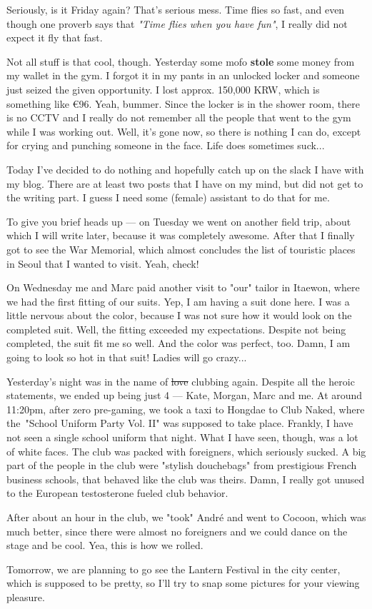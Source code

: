 \begin{post}
	\begin{content}
Seriously, is it Friday again? That's serious mess. Time flies so fast, and even though one proverb says that \textit{"Time flies when you have fun"}, I really did not expect it fly that fast.

Not all stuff is that cool, though. Yesterday some mofo \textbf{stole} some money from my wallet in the gym. I forgot it in my pants in an unlocked locker and someone just seized the given opportunity. I lost approx. 150,000 KRW, which is something like €96. Yeah, bummer. Since the locker is in the shower room, there is no CCTV and I really do not remember all the people that went to the gym while I was working out. Well, it's gone now, so there is nothing I can do, except for crying and punching someone in the face. Life does sometimes suck...

Today I've decided to do nothing and hopefully catch up on the slack I have with my blog. There are at least two posts that I have on my mind, but did not get to the writing part. I guess I need some (female) assistant to do that for me.

To give you brief heads up — on Tuesday we went on another field trip, about which I will write later, because it was completely awesome. After that I finally got to see the War Memorial, which almost concludes the list of touristic places in Seoul that I wanted to visit. Yeah, check!

On Wednesday me and Marc paid another visit to "our" tailor in Itaewon, where we had the first fitting of our suits. Yep, I am having a suit done here. I was a little nervous about the color, because I was not sure how it would look on the completed suit. Well, the fitting exceeded my expectations. Despite not being completed, the suit fit me so well. And the color was perfect, too. Damn, I am going to look so hot in that suit! Ladies will go crazy...

Yesterday's night was in the name of \sout{love} clubbing again. Despite all the heroic statements, we ended up being just 4 — Kate, Morgan, Marc and me. At around 11:20pm, after zero pre-gaming, we took a taxi to Hongdae to Club Naked, where the "School Uniform Party Vol. II" was supposed to take place. Frankly, I have not seen a single school uniform that night. What I have seen, though, was a lot of white faces. The club was packed with foreigners, which seriously sucked. A big part of the people in the club were "stylish douchebags" from prestigious French business schools, that behaved like the club was theirs. Damn, I really got unused to the European testosterone fueled club behavior.

After about an hour in the club, we "took" André and went to Cocoon, which was much better, since there were almost no foreigners and we could dance on the stage and be cool. Yea, this is how we rolled.

Tomorrow, we are planning to go see the Lantern Festival in the city center, which is supposed to be pretty, so I'll try to snap some pictures for your viewing pleasure.
	\end{content}
\end{post}

